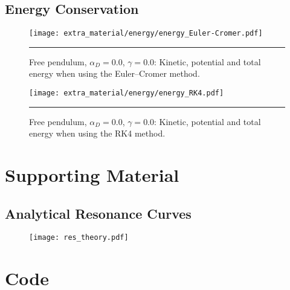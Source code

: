 \documentclass[notitlepage,aps,prd,nofootinbib]{revtex4-1}
\begin{document}
\clearpage
\subsection{Energy Conservation}
\label{subsec:E_conservation}

\begin{figure}[!htbc]
  \centering
  \texttt{[image: extra\_material/energy/energy\_Euler-Cromer.pdf]}
	{\par\nobreak\rule[9pt]{35em}{0.5pt}\vspace{-5mm}}
	\caption{Free pendulum, $\alpha_{D} = 0.0$, $\gamma = 0.0$: Kinetic, potential and total energy when using the Euler--Cromer method.}
	\label{fig:energy_conservation_Euler-Cromer}
\end{figure}

\begin{figure}[!htbc]
  \centering
  \texttt{[image: extra\_material/energy/energy\_RK4.pdf]}
	{\par\nobreak\rule[9pt]{35em}{0.5pt}\vspace{-5mm}}
	\caption{Free pendulum, $\alpha_{D} = 0.0$, $\gamma = 0.0$: Kinetic, potential and total energy when using the RK4 method.}
	\label{fig:energy_conservation_RK4}
\end{figure}

\clearpage
\section{Supporting Material}
\label{sec:Supporting_Material}


\clearpage
\subsection{Analytical Resonance Curves} \label{subsec:mathematica_plot}

\graphicspath{ {../} }
\begin{figure}[!htbc]
  \centering
  \texttt{[image: res\_theory.pdf]}
\end{figure}


\clearpage


\clearpage
\section{Code}
\label{sec:code}


\end{document}

